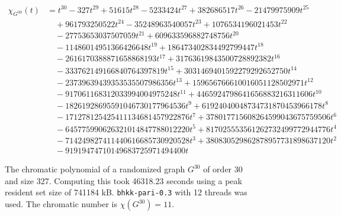 \documentclass{cslthse-msc}
\newcommand{\code}{\texttt}
\begin{document}
\begin{appendices}
 \begin{figure}[tb]
  \begin{equation*}
   \begin{split}
    \chi_{G^{30}}(t) & = t^{30} -327t^{29} + 51615t^{28} - 5233424t^{27} + 382686517t^{26} - 21479975909t^{25} \\
     & \quad + 961793250522t^{24} - 35248963540057t^{23} + 1076534196021453t^{22} \\
     & \quad - 27753653037507059t^{21} + 609633596882748756t^{20} \\
     & \quad - 11486014951366426648t^{19} + 186473402834492799447t^{18} \\
     & \quad - 2616170388871658868193t^{17} + 31763619843500728892382t^{16} \\
     & \quad - 333762149166840764397819t^{15} + 3031469401592279292652750t^{14} \\
     & \quad - 23739639439353535507986356t^{13} + 159656766610016051128502971t^{12} \\
     & \quad - 917061168312033994004975248t^{11} + 4465924798641656883216311606t^{10} \\
     & \quad - 18261928695591046730177964536t^9 + 61924040048734731870453966178t^8 \\
     & \quad - 171278125425411134681457922876t^7 + 378017715608264599043675759506t^6 \\
     & \quad - 645775990626321014847788012220t^5 + 817025553561262732499772944776t^4 \\
     & \quad - 714249827411440616685730920528t^3 + 380830529862878957731898637120t^2 \\
     & \quad - 91919474710149683725971494400t
   \end{split}
  \end{equation*}
  \caption{The chromatic polynomial of a randomized graph $G^{30}$ of order 30 and size 327. Computing this took 46318.23 seconds using a peak resident set size of 741184 kB. \code{bhkk-pari-0.3} with 12 threads was used. The chromatic number is $\chi(G^{30}) = 11$.}
  \label{g30}
 \end{figure}
 

\end{appendices}
\end{document}
